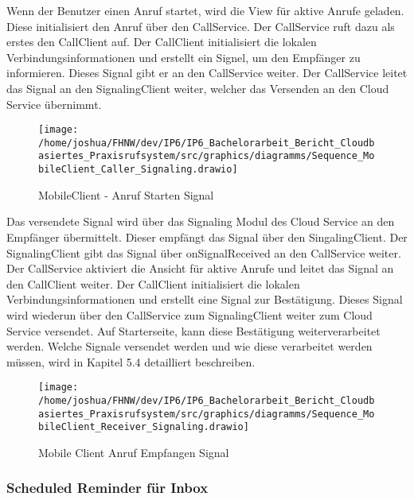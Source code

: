 Wenn der Benutzer einen Anruf startet, wird die View für aktive Anrufe geladen.
Diese initialisiert den Anruf über den CallService.
Der CallService ruft dazu als erstes den CallClient auf.
Der CallClient initialisiert die lokalen Verbindungsinformationen und erstellt ein Signel, um den Empfänger zu informieren.
Dieses Signal gibt er an den CallService weiter.
Der CallService leitet das Signal an den SignalingClient weiter, welcher das Versenden an den Cloud Service übernimmt.

\begin{figure}[h]
    \centering
    \begin{minipage}[b]{0.8\textwidth}
        \texttt{[image: /home/joshua/FHNW/dev/IP6/IP6\_Bachelorarbeit\_Bericht\_Cloudbasiertes\_Praxisrufsystem/src/graphics/diagramms/Sequence\_MobileClient\_Caller\_Signaling.drawio]}
        \caption{MobileClient - Anruf Starten Signal}
    \end{minipage}
\end{figure}

Das versendete Signal wird über das Signaling Modul des Cloud Service an den Empfänger übermittelt.
Dieser empfängt das Signal über den SingalingClient.
Der SignalingClient gibt das Signal über onSignalReceived an den CallService weiter.
Der CallService aktiviert die Ansicht für aktive Anrufe und leitet das Signal an den CallClient weiter.
Der CallClient initialisiert die lokalen Verbindungsinformationen und erstellt eine Signal zur Bestätigung.
Dieses Signal wird wiederun über den CallService zum SignalingClient weiter zum Cloud Service versendet.
Auf Starterseite, kann diese Bestätigung weiterverarbeitet werden.
Welche Signale versendet werden und wie diese verarbeitet werden müssen, wird in Kapitel 5.4 detailliert beschreiben.

\begin{figure}[h]
    \centering
    \begin{minipage}[b]{0.8\textwidth}
        \texttt{[image: /home/joshua/FHNW/dev/IP6/IP6\_Bachelorarbeit\_Bericht\_Cloudbasiertes\_Praxisrufsystem/src/graphics/diagramms/Sequence\_MobileClient\_Receiver\_Signaling.drawio]}
        \caption{Mobile Client Anruf Empfangen Signal}
    \end{minipage}
\end{figure}


\subsubsection{Scheduled Reminder für Inbox}

